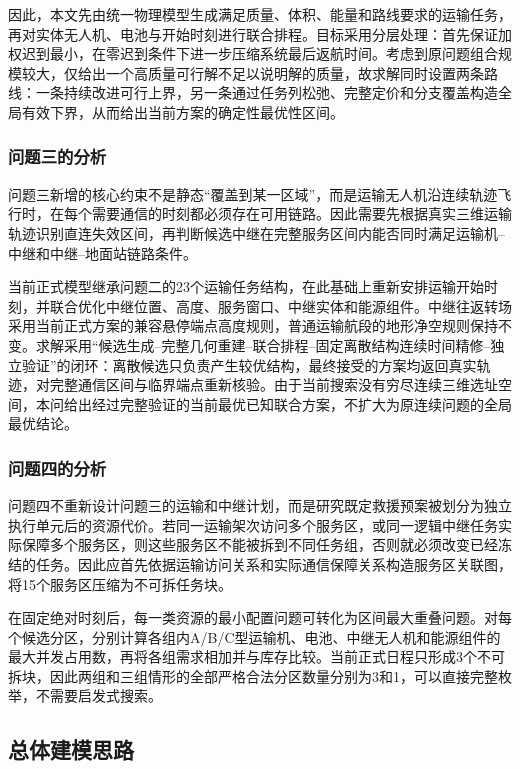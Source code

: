 \documentclass[UTF8,a4paper,12pt]{ctexart}
\begin{document}
因此，本文先由统一物理模型生成满足质量、体积、能量和路线要求的运输任务，再对实体无人机、电池与开始时刻进行联合排程。目标采用分层处理：首先保证加权迟到最小，在零迟到条件下进一步压缩系统最后返航时间。考虑到原问题组合规模较大，仅给出一个高质量可行解不足以说明解的质量，故求解同时设置两条路线：一条持续改进可行上界，另一条通过任务列松弛、完整定价和分支覆盖构造全局有效下界，从而给出当前方案的确定性最优性区间。

\subsubsection{问题三的分析}

问题三新增的核心约束不是静态“覆盖到某一区域”，而是运输无人机沿连续轨迹飞行时，在每个需要通信的时刻都必须存在可用链路。因此需要先根据真实三维运输轨迹识别直连失效区间，再判断候选中继在完整服务区间内能否同时满足运输机--中继和中继--地面站链路条件。

当前正式模型继承问题二的23个运输任务结构，在此基础上重新安排运输开始时刻，并联合优化中继位置、高度、服务窗口、中继实体和能源组件。中继往返转场采用当前正式方案的兼容悬停端点高度规则，普通运输航段的地形净空规则保持不变。求解采用“候选生成--完整几何重建--联合排程--固定离散结构连续时间精修--独立验证”的闭环：离散候选只负责产生较优结构，最终接受的方案均返回真实轨迹，对完整通信区间与临界端点重新核验。由于当前搜索没有穷尽连续三维选址空间，本问给出经过完整验证的当前最优已知联合方案，不扩大为原连续问题的全局最优结论。

\subsubsection{问题四的分析}

问题四不重新设计问题三的运输和中继计划，而是研究既定救援预案被划分为独立执行单元后的资源代价。若同一运输架次访问多个服务区，或同一逻辑中继任务实际保障多个服务区，则这些服务区不能被拆到不同任务组，否则就必须改变已经冻结的任务。因此应首先依据运输访问关系和实际通信保障关系构造服务区关联图，将15个服务区压缩为不可拆任务块。

在固定绝对时刻后，每一类资源的最小配置问题可转化为区间最大重叠问题。对每个候选分区，分别计算各组内A/B/C型运输机、电池、中继无人机和能源组件的最大并发占用数，再将各组需求相加并与库存比较。当前正式日程只形成3个不可拆块，因此两组和三组情形的全部严格合法分区数量分别为3和1，可以直接完整枚举，不需要启发式搜索。

\subsection{总体建模思路}
\end{document}
